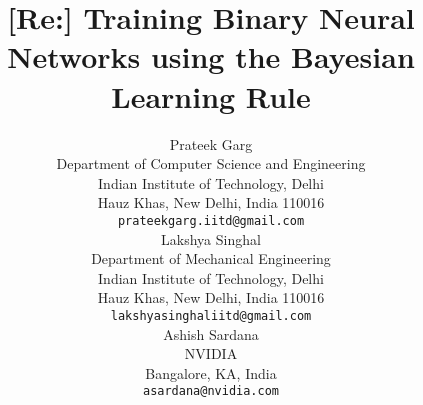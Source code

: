 \documentclass{article}
\title{[Re:] Training Binary Neural Networks using the Bayesian Learning Rule}
\author{
  Prateek Garg\\
  Department of Computer Science and Engineering\\
  Indian Institute of Technology, Delhi\\
  Hauz Khas, New Delhi, India 110016 \\
  \texttt{prateekgarg.iitd@gmail.com} \\
  
   \And
   Lakshya Singhal \\
   Department of Mechanical Engineering \\
   Indian Institute of Technology, Delhi\\
   Hauz Khas, New Delhi, India 110016 \\
  \texttt{lakshyasinghaliitd@gmail.com} \\
  
   \AND
   Ashish Sardana \\
   NVIDIA \\
   Bangalore, KA, India \\
   \texttt{asardana@nvidia.com} \\
}
\begin{document}
\maketitle


\nocite{*}





\end{document}
